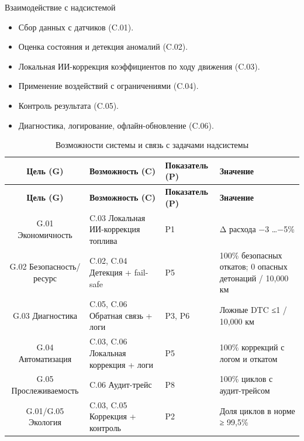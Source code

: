 \documentclass[14pt, a4paper]{extarticle}
\begin{document}
		Взаимодействие с надсистемой
		\begin{itemize}
			\item Сбор данных с датчиков (C.01).
			
			\item Оценка состояния и детекция аномалий (C.02).
			
			\item Локальная ИИ-коррекция коэффициентов по ходу движения (C.03).
			
			\item Применение воздействий с ограничениями (C.04).
			
			\item Контроль результата (C.05).
			
			\item Диагностика, логирование, офлайн-обновление (C.06).
		\end{itemize}
		
		\vspace{\parindent}
		\noindent
		\begin{xltabular}{\textwidth}{|c|L|L|L|}
			\caption{Возможности системы и связь с задачами надсистемы}\label{tab:traceability}\\
			\hline
			\textbf{Цель (G)} & \textbf{Возможность (C)} & \textbf{Показатель (P)} & \textbf{Значение} \\
			\hline
			\endfirsthead
			\hline
			\textbf{Цель (G)} & \textbf{Возможность (C)} & \textbf{Показатель (P)} & \textbf{Значение} \\
			\hline
			\endhead
			\hline
			\endfoot
			\hline
			\endlastfoot
			G.01 Экономичность & C.03 Локальная ИИ-коррекция топлива & P1 & Δ расхода −3 …−5\% \\
			\hline
			G.02 Безопасность/ресурс & C.02, C.04 Детекция + fail-safe & P5 & 100\% безопасных откатов; 0 опасных детонаций / 10,000 км \\
			\hline
			G.03 Диагностика & C.05, C.06 Обратная связь + логи & P3, P6 & Ложные DTC ≤1 / 10,000 км \\
			\hline
			G.04 Автоматизация & C.03, C.06 Локальная коррекция + логи & P5 & 100\% коррекций с логом и откатом \\
			\hline
			G.05 Прослеживаемость & C.06 Аудит-трейс & P8 & 100\% циклов с аудит-трейсом \\
			\hline
			G.01/G.05 Экология & C.03, C.05 Коррекция + контроль & P2 & Доля циклов в норме ≥ 99,5\% \\
			\hline
		\end{xltabular}
		
\end{document}
